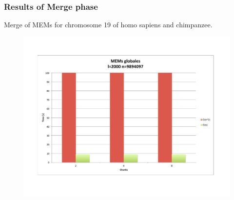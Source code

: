 \documentclass{beamer}
\begin{document}
\begin{frame}
  \frametitle{Results of Merge phase}
  \begin{block}{}
    Merge of MEMs for chromosome 19 of homo sapiens and chimpanzee.
  \end{block}
  \begin{figure}\includegraphics[scale=0.4]{hspanMEMGlobal.pdf}\end{figure}
\end{frame}
\end{document}
